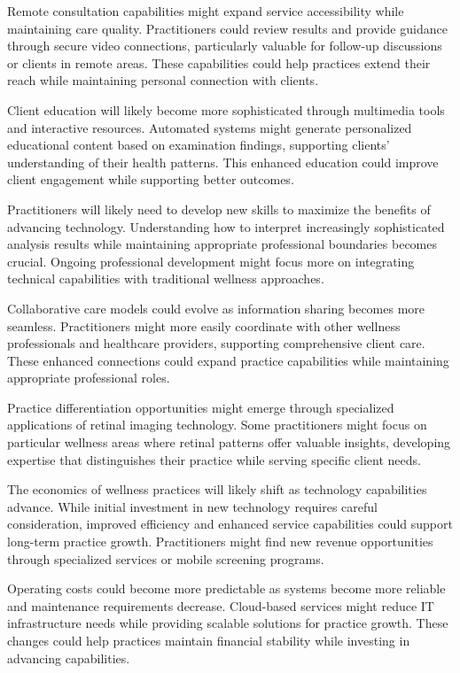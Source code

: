\documentclass[
  Letterpaper,
]{scrbook}
\begin{document}
Remote consultation capabilities might expand service accessibility
while maintaining care quality. Practitioners could review results and
provide guidance through secure video connections, particularly valuable
for follow-up discussions or clients in remote areas. These capabilities
could help practices extend their reach while maintaining personal
connection with clients.

Client education will likely become more sophisticated through
multimedia tools and interactive resources. Automated systems might
generate personalized educational content based on examination findings,
supporting clients' understanding of their health patterns. This
enhanced education could improve client engagement while supporting
better outcomes.

Practitioners will likely need to develop new skills to maximize the
benefits of advancing technology. Understanding how to interpret
increasingly sophisticated analysis results while maintaining
appropriate professional boundaries becomes crucial. Ongoing
professional development might focus more on integrating technical
capabilities with traditional wellness approaches.

Collaborative care models could evolve as information sharing becomes
more seamless. Practitioners might more easily coordinate with other
wellness professionals and healthcare providers, supporting
comprehensive client care. These enhanced connections could expand
practice capabilities while maintaining appropriate professional roles.

Practice differentiation opportunities might emerge through specialized
applications of retinal imaging technology. Some practitioners might
focus on particular wellness areas where retinal patterns offer valuable
insights, developing expertise that distinguishes their practice while
serving specific client needs.

The economics of wellness practices will likely shift as technology
capabilities advance. While initial investment in new technology
requires careful consideration, improved efficiency and enhanced service
capabilities could support long-term practice growth. Practitioners
might find new revenue opportunities through specialized services or
mobile screening programs.

Operating costs could become more predictable as systems become more
reliable and maintenance requirements decrease. Cloud-based services
might reduce IT infrastructure needs while providing scalable solutions
for practice growth. These changes could help practices maintain
financial stability while investing in advancing capabilities.
\end{document}
